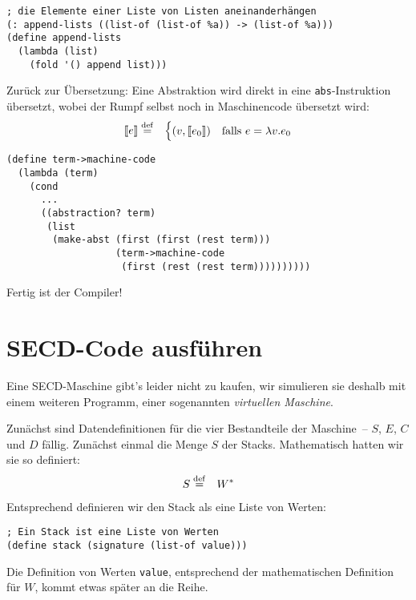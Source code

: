 %
\begin{lstlisting}
; die Elemente einer Liste von Listen aneinanderhängen
(: append-lists ((list-of (list-of %a)) -> (list-of %a)))
(define append-lists
  (lambda (list)
    (fold '() append list)))
\end{lstlisting}
%
Zurück zur Übersetzung: Eine Abstraktion wird direkt in eine
\lstinline{abs}-Instruktion übersetzt, wobei der Rumpf selbst
noch in Maschinencode übersetzt wird:
\begin{eqnarray*}
  \llbracket e \rrbracket &\stackrel{\rm def}{=}&
  \begin{cases}
    (v, \llbracket e_0\rrbracket) & \textrm{falls $e = \lambda v.e_0$}
  \end{cases}
\end{eqnarray*}
%
\begin{lstlisting}
(define term->machine-code
  (lambda (term)
    (cond
      ...
      ((abstraction? term)
       (list
        (make-abst (first (first (rest term)))
                   (term->machine-code
                    (first (rest (rest term))))))))))
\end{lstlisting}
%
Fertig ist der Compiler!

\section{SECD-Code ausführen}
\label{sec:secd-transition}

Eine SECD-Maschine gibt's leider nicht zu kaufen, wir simulieren sie
deshalb mit einem weiteren Programm, einer sogenannten
\textit{virtuellen Maschine}.

Zunächst sind Datendefinitionen für die vier Bestandteile der
Maschine~-- $S$, $E$, $C$ und $D$ fällig.  Zunächst einmal die Menge
$S$ der Stacks.  Mathematisch hatten wir sie so definiert:
%
\begin{eqnarray*}
    S &\stackrel{\rm def}{=}& W^\ast
\end{eqnarray*}
%
Entsprechend definieren wir den Stack als eine Liste von Werten:
%
\begin{lstlisting}
; Ein Stack ist eine Liste von Werten
(define stack (signature (list-of value)))
\end{lstlisting}
%
Die Definition von Werten \lstinline{value}, entsprechend der
mathematischen Definition für $W$, kommt etwas später an die Reihe.

